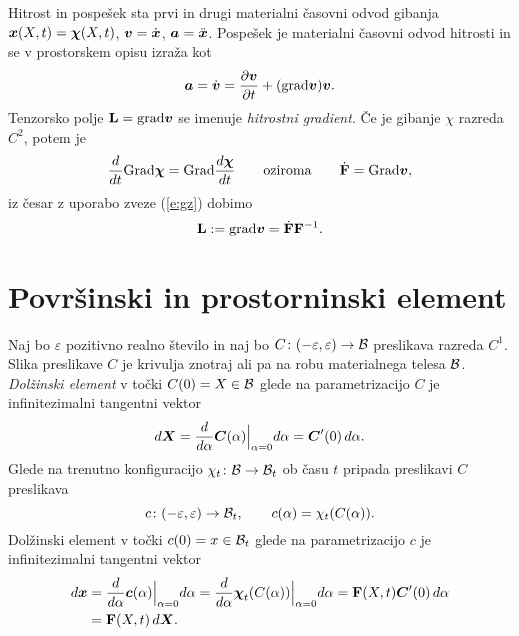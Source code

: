 \begin{primer} %
	Hitrost in pospešek sta prvi in drugi materialni časovni odvod gibanja $\boldsymbol x(X,t)=\boldsymbol \chi(X,t)$,
	$\boldsymbol v=\dot{\boldsymbol x}$, $\boldsymbol a=\ddot{\boldsymbol x}$.
	Pospešek je materialni časovni odvod hitrosti in se v prostorskem opisu izraža kot
	\begin{equation} \label{e:maohit}
		\boldsymbol a=\dot{\boldsymbol v}=\frac{\partial\boldsymbol v}{\partial t}+(\mathrm{grad}\boldsymbol v)\boldsymbol v.
	\end{equation}
	Tenzorsko polje $\mathbf L=\mathrm{grad}\boldsymbol v$ se imenuje \emph{hitrostni gradient}.
	Če je gibanje $\chi$ razreda $C^2$, potem je
	\[
		\frac{d}{dt}\mathrm{Grad}\boldsymbol \chi=\mathrm{Grad}\frac{d\boldsymbol \chi}{dt}\qquad\textrm{oziroma}\qquad
		\dot{\mathbf F}=\mathrm{Grad}\boldsymbol v,
	\]
	iz česar z uporabo zveze (\ref{e:gz}) dobimo
	\begin{equation} \label{e:L}
		\mathbf L:=\mathrm{grad}\boldsymbol v=\dot{\mathbf F}\mathbf F^{-1}.
	\end{equation}
\end{primer}


\section{Površinski in prostorninski element}


Naj bo $\varepsilon$ pozitivno realno število in naj bo $C\colon(-\varepsilon,\varepsilon)\to\mathcal B$
preslikava razreda $C^1$. Slika preslikave $C$ je krivulja znotraj ali pa na robu
materialnega telesa $\mathcal B$. \emph{Dolžinski element} v točki $C(0)=X\in\mathcal B$ glede na parametrizacijo $C$
je infinitezimalni tangentni vektor
\[
	d\boldsymbol X=\frac{d}{d\alpha}\boldsymbol C(\alpha)\Big|_{\alpha=0}d\alpha=\boldsymbol C'(0)\, d\alpha.
\]
Glede na trenutno konfiguracijo $\chi_t\colon\mathcal B\to\mathcal B_t$ ob času $t$ pripada preslikavi $C$ preslikava
\[
	c\colon(-\varepsilon,\varepsilon)\to\mathcal B_t,\qquad c(\alpha)=\chi_t(C(\alpha)).
\]
Dolžinski element v točki $c(0)=x\in\mathcal B_t$ glede na parametrizacijo $c$ je infinitezimalni
tangentni vektor
\begin{align*}
	d\boldsymbol x&=\frac{d}{d\alpha}\boldsymbol c(\alpha)\Big|_{\alpha=0}d\alpha
	=\frac{d}{d\alpha}\boldsymbol \chi_t(C(\alpha))\Big|_{\alpha=0}d\alpha
	=\mathbf F(X,t)\boldsymbol C'(0)\,d\alpha \\
	&=\mathbf F(X,t)\,d\boldsymbol X.
\end{align*}


